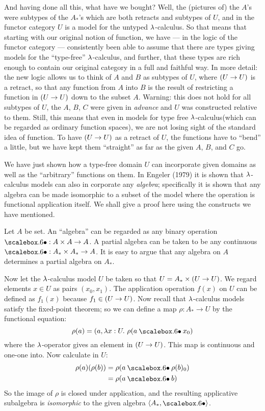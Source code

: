 And having done all this, what have we bought? Well, the (pictures of) the $A$'s were subtypes of the $A_*$'s which are both retracts and subtypes of $U$, and in the functor category $U$ is a model for the untyped $\lambda$-calculus. So that means that starting with our original notion of function, we have --- in the logic of the functor category --- consistently been able to assume that there are types giving models for the ``type-free'' $\lambda$-calculus,
and further, that these types are rich enough to contain our original category in a full and faithful way. In more detail: the new logic allows us to think of $A$ and $B$ as subtypes of $U$, where $(U\rightarrow U)$ is a retract, so that any function from $A$ into $B$ is the result of restricting a function in $(U\rightarrow U)$ down to the subset $A$. Warning: this does not hold for all subtypes of $U$, the $A$, $B$, $C$ were given in {\it advance} and $U$ was constructed relative to them. Still, this means that even in models for type free $\lambda$-calculus(which can be regarded as ordinary function spaces), we are not losing sight of the standard idea of function. To have $(U\rightarrow U)$ as a retract of $U$, the functions have to ``bend'' a little, but we have kept them ``straight'' as far as the given $A$, $B$, and $C$ go.

We have just shown how a type-free domain $U$ can incorporate given domains as well as the ``arbitrary'' functions on them. In Engeler (1979) it is shown that $\lambda$-calculus models can also in corporate any {\it algebra}; specifically it is shown that any algebra can be made isomorphic to a subset of the model where the operation is functional application itself. We shall give a proof here using the constructs we have mentioned.

Let $A$ be set. An ``algebra'' can be regarded as any binary operation $\dotop : A\times A\to A$.
A partial algebra can be taken to be any continuous $\dotop : A_* \times A_* \to A$.
It is easy to argue that any algebra on $A$ determines a partial algebra on $A_*$.

Now let the $\lambda$-calculus model $U$ be taken so that
$U = A_* \times  (U\rightarrow U)$. We regard elements $x \in U$ as pairs $(x_0 , x_1 )$.
The application operation $f(x)$ on $U$ can be defined as $f_1(x)$ because $f_1 \in (U\rightarrow U)$. Now recall that $\lambda$-calculus models satisfy
the fixed-point theorem; so we can define a map $\rho: A_*\to U$ by the functional equation:
$$
\rho(a)  =  (a, \l x: U. \,\,\rho (a \dotop x_0)
$$
where the $\lambda$-operator gives an element in $(U\rightarrow U)$. This map is continuous and one-one into. Now calculate in $U$:
\begin{align*}
\rho(a)(\rho(b)) &= \rho(a\dotop \rho(b)_0)\\
&= \rho( a  \dotop  b)
\end{align*}
So the image of $\rho$ is closed under application, and the resulting applicative subalgebra is {\it isomorphic} to the given algebra
$\langle A_*, \dotop \rangle$.

